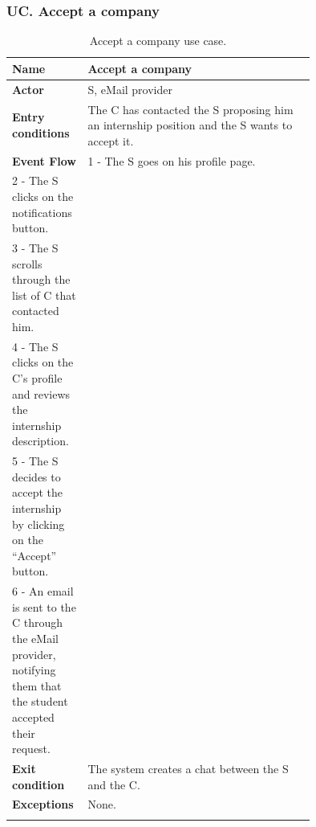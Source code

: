 \subsubsection*{UC\cuc . Accept a company}
\begin{center}
    \begin{longtable}{|l|p{0.75\linewidth}|}
        \hline
        \textbf{Name}               & Accept a company\\
        \hline
        \textbf{Actor}              & S, eMail provider\\
        \hline
        \textbf{Entry conditions}   & The C has contacted the S proposing him an internship position and the S wants to accept it.\\
        \hline
        \textbf{Event Flow}         & 
        1 - The S goes on his profile page. \\
        2 - The S clicks on the notifications button. \\
        3 - The S scrolls through the list of C that contacted him. \\
        4 - The S clicks on the C’s profile and reviews the internship description. \\
        5 - The S decides to accept the internship by clicking on the “Accept” button. \\
        6 - An email is sent to the C through the eMail provider, notifying them that the student accepted their request. \\
        \hline
        \textbf{Exit condition}   & The system creates a chat between the S and the C. \\       
        \hline
        \textbf{Exceptions}       & None. \\
        \hline
        \caption{Accept a company use case.}
        \label{tab: accept_company_use_case}
    \end{longtable}
\end{center}


